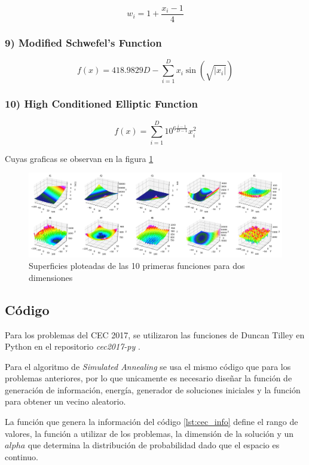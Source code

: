 \documentclass[12pt,twoside]{article}
\begin{document}
	\[
	w_i = 1 + \frac{x_i - 1}{4}
	\]
	
	\subsubsection*{9) Modified Schwefel's Function}
	\[
	f(x) = 418.9829 D - \sum_{i=1}^{D} x_i \sin(\sqrt{|x_i|})
	\]
	
	\subsubsection*{10) High Conditioned Elliptic Function}
	\[
	f(x) = \sum_{i=1}^{D} 10^{6 \frac{i-1}{D-1}} x_i^2
	\]
	
	Cuyas graficas se observan en la figura \ref{fig:cec}
	
	\begin{figure}[H]
		\centering
		\includegraphics[width=1\linewidth]{img/cec}
		\caption{Superficies ploteadas de las 10 primeras funciones para dos dimensiones \cite{plot}}
		\label{fig:cec}
	\end{figure}
	
	\subsection{Código}
	
	Para los problemas del CEC 2017, se utilizaron las funciones de Duncan Tilley en Python en el repositorio \textit{cec2017-py} \cite{git}.
	
	Para el algoritmo de \textit{Simulated Annealing} se usa el mismo código que para los problemas anteriores, por lo que unicamente es necesario diseñar la función de generación de información, energía, generador de soluciones iniciales  y la función para obtener un vecino aleatorio.
	
	La función que genera la información del código \ref{lst:cec_info} define el rango de valores, la función a utilizar de los problemas, la dimensión de la solución y un $alpha$ que determina la distribución de probabilidad dado que el espacio es continuo.
	
\end{document}
